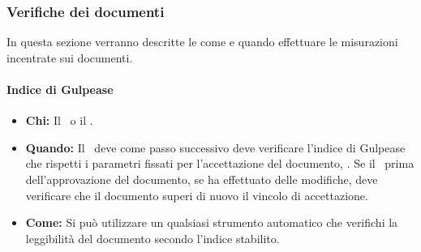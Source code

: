 \subsubsection{Verifiche dei documenti}
In questa sezione verranno descritte le come e quando effettuare le misurazioni incentrate sui documenti.

\paragraph{Indice di Gulpease}
\begin{itemize}
\item \textbf{Chi:} Il \Ver\ o il \Pm.
\item \textbf{Quando:} Il \Ver\ deve come passo successivo deve verificare l'indice di Gulpease che rispetti i parametri fissati per l'accettazione del documento, . Se il \Pm\ prima dell'approvazione del documento, se ha effettuato delle modifiche, deve verificare che il documento superi di nuovo il vincolo di accettazione.
\item \textbf{Come:} Si può utilizzare un qualsiasi strumento automatico che verifichi la leggibilità del documento secondo l'indice stabilito.
\end{itemize}